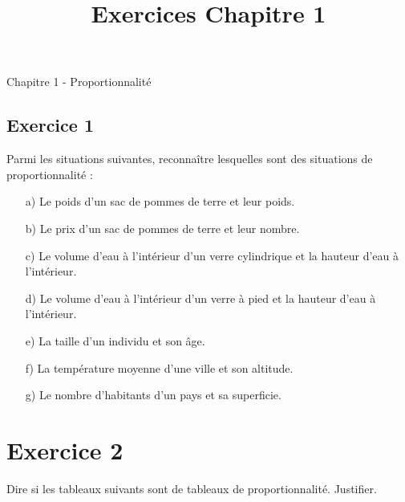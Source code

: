 \documentclass[12 pt]{extarticle}
\title{Exercices Chapitre 1}
\date{}
\theoremstyle{plain}
\begin{document}
\begin{center}{\Large Chapitre 1 - Proportionnalité}\\
 \end{center} 

\subsection*{Exercice 1}

Parmi les situations suivantes, reconnaître lesquelles sont des situations de proportionnalité : \begin{itemize}
\item[a)] Le poids d'un sac de pommes de terre et leur poids.
\item[b)] Le prix d'un sac de pommes de terre et leur nombre.
\item[c)] Le volume d'eau à l'intérieur d'un verre cylindrique 
et la hauteur d'eau à l'intérieur. 
\item[d)] Le volume d'eau à l'intérieur d'un verre à pied
et la hauteur d'eau à l'intérieur. 
\item[e)] La taille d'un individu et son âge.
\item[f)] La température moyenne d'une ville et son altitude. 
\item[g)] Le nombre d'habitants d'un pays et sa superficie. 
\end{itemize}



\section*{Exercice 2}
{Dire si les tableaux suivants sont de tableaux de proportionnalité. Justifier.}
\end{document}
